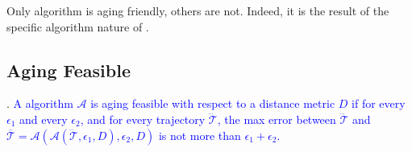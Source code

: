 Only algorithm \dpa is aging friendly, others are not. Indeed, it is the result of the specific algorithm nature of \dpa.

\subsection{Aging Feasible}

. \textcolor{blue}{A \lsa algorithm $\mathcal{A}$ is aging feasible with respect to a distance metric $D$ if for every $\epsilon_1$ and every $\epsilon_2$, and for every trajectory $\dddot{\mathcal{T}}$, the max error between $\dddot{\mathcal{T}}$ and $\overline{\mathcal{T}}=\mathcal{A}(\mathcal{A}(\dddot{\mathcal{T}}, \epsilon_1, D), \epsilon_2, D)$ is not more than $\epsilon_1+ \epsilon_2$.}


